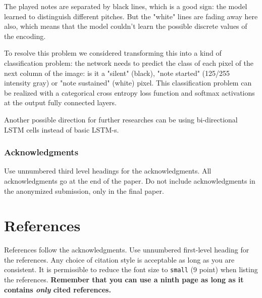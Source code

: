 \documentclass{article}
\begin{document}
The played notes are separated by black lines, which is a good sign: the model learned to distinguish different pitches. But the "white" lines are fading away here also, which means that the model couldn't learn the possible discrete values of the encoding. 

To resolve this problem we considered transforming this into a kind of classification problem: the network needs to predict the class of each pixel of the next column of the image: is it a "silent" (black), "note started" (125/255 intensity gray) or "note sustained" (white) pixel. This classification problem can be realized with a categorical cross entropy loss function and softmax activations at the output fully connected layers. 

Another possible direction for further researches can be using bi-directional LSTM cells instead of basic LSTM-s. 

\subsubsection*{Acknowledgments}

Use unnumbered third level headings for the acknowledgments. All
acknowledgments go at the end of the paper. Do not include
acknowledgments in the anonymized submission, only in the final paper.

\section*{References}

References follow the acknowledgments. Use unnumbered first-level
heading for the references. Any choice of citation style is acceptable
as long as you are consistent. It is permissible to reduce the font
size to \verb+small+ (9 point) when listing the references. {\bf
  Remember that you can use a ninth page as long as it contains
  \emph{only} cited references.}
\medskip

\small
\end{document}
